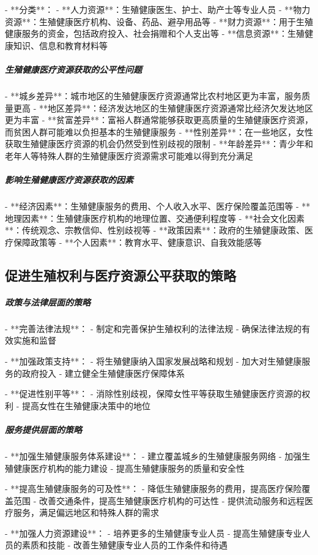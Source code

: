 \begin{enumerate}
- **分类**：
  - **人力资源**：生殖健康医生、护士、助产士等专业人员
  - **物力资源**：生殖健康医疗机构、设备、药品、避孕用品等
  - **财力资源**：用于生殖健康服务的资金，包括政府投入、社会捐赠和个人支出等
  - **信息资源**：生殖健康知识、信息和教育材料等

\subparagraph{生殖健康医疗资源获取的公平性问题}

- **城乡差异**：城市地区的生殖健康医疗资源通常比农村地区更为丰富，服务质量更高
- **地区差异**：经济发达地区的生殖健康医疗资源通常比经济欠发达地区更为丰富
- **贫富差异**：富裕人群通常能够获取更高质量的生殖健康医疗资源，而贫困人群可能难以负担基本的生殖健康服务
- **性别差异**：在一些地区，女性获取生殖健康医疗资源的机会仍然受到性别歧视的限制
- **年龄差异**：青少年和老年人等特殊人群的生殖健康医疗资源需求可能难以得到充分满足

\subparagraph{影响生殖健康医疗资源获取的因素}

- **经济因素**：生殖健康服务的费用、个人收入水平、医疗保险覆盖范围等
- **地理因素**：生殖健康医疗机构的地理位置、交通便利程度等
- **社会文化因素**：传统观念、宗教信仰、性别歧视等
- **政策因素**：政府的生殖健康政策、医疗保障政策等
- **个人因素**：教育水平、健康意识、自我效能感等

\subsection{促进生殖权利与医疗资源公平获取的策略}

\subparagraph{政策与法律层面的策略}

- **完善法律法规**：
  - 制定和完善保护生殖权利的法律法规
  - 确保法律法规的有效实施和监督

- **加强政策支持**：
  - 将生殖健康纳入国家发展战略和规划
  - 加大对生殖健康服务的政府投入
  - 建立健全生殖健康医疗保障体系

- **促进性别平等**：
  - 消除性别歧视，保障女性平等获取生殖健康医疗资源的权利
  - 提高女性在生殖健康决策中的地位

\subparagraph{服务提供层面的策略}

- **加强生殖健康服务体系建设**：
  - 建立覆盖城乡的生殖健康服务网络
  - 加强生殖健康医疗机构的能力建设
  - 提高生殖健康服务的质量和安全性

- **提高生殖健康服务的可及性**：
  - 降低生殖健康服务的费用，提高医疗保险覆盖范围
  - 改善交通条件，提高生殖健康医疗机构的可达性
  - 提供流动服务和远程医疗服务，满足偏远地区和特殊人群的需求

- **加强人力资源建设**：
  - 培养更多的生殖健康专业人员
  - 提高生殖健康专业人员的素质和技能
  - 改善生殖健康专业人员的工作条件和待遇


\end{enumerate}
